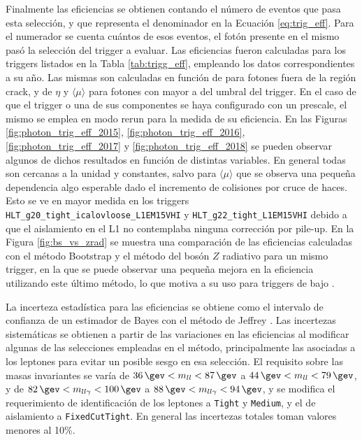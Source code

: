 Finalmente las eficiencias se obtienen contando el número de eventos que pasa esta selección, y que representa el denominador en la Ecuación \ref{eq:trig_eff}. Para el numerador se cuenta cuántos de esos eventos, el fotón presente en el mismo pasó la selección del trigger a evaluar. Las eficiencias fueron calculadas para los triggers listados en la Tabla \ref{tab:trigg_eff}, empleando los datos correspondientes a su año. Las mismas son calculadas en función de \ET para fotones fuera de la región crack, y de $\eta$ y $\langle\mu\rangle$ para fotones con \ET mayor a  del umbral del trigger. En el caso de que el trigger o una de sus componentes se haya configurado con un prescale, el mismo se emplea en modo rerun para la medida de su eficiencia. En las Figuras \ref{fig:photon_trig_eff_2015}, \ref{fig:photon_trig_eff_2016}, \ref{fig:photon_trig_eff_2017} y \ref{fig:photon_trig_eff_2018} se pueden observar algunos de dichos resultados en función de distintas variables. En general todas son cercanas a la unidad y constantes, salvo para $\langle\mu\rangle$ que se observa una pequeña dependencia algo esperable dado el incremento de colisiones por cruce de haces. Esto se ve en mayor medida en los triggers \texttt{HLT\_g20\_tight\_icalovloose\_L1EM15VHI} y \texttt{HLT\_g22\_tight\_L1EM15VHI} debido a que 
el aislamiento en el L1 no contemplaba ninguna corrección por pile-up.
En la Figura \ref{fig:bs_vs_zrad} se muestra una comparación de las eficiencias calculadas con el método Bootstrap \cite{tesis_joaco} y el método del bosón $Z$ radiativo para un mismo trigger, en la que se puede observar una pequeña mejora en la eficiencia utilizando este último método, lo que motiva a su uso para triggers de bajo \ET.



La incerteza estadística para las eficiencias se obtiene como el intervalo de confianza de un estimador de Bayes con el método de Jeffrey \cite{Casadei_2012}.
Las incertezas sistemáticas se obtienen a partir de las variaciones en las eficiencias al modificar algunas de las selecciones empleadas en el método, principalmente las asociadas a los leptones para evitar un posible sesgo en esa selección. El requisito sobre las masas invariantes se varía de $36\,\gev<m_{ll}<87\,\gev$ a $44\,\gev<m_{ll}<79\,\gev$, y de 
$82\,\gev<m_{ll\gamma}<100\,\gev$ a $88\,\gev<m_{ll\gamma}<94\,\gev$, y se modifica el requerimiento de identificación de los leptones a \texttt{Tight} y \texttt{Medium}, y el de aislamiento a \texttt{FixedCutTight}. En general las incertezas totales toman valores menores al 10\%.




